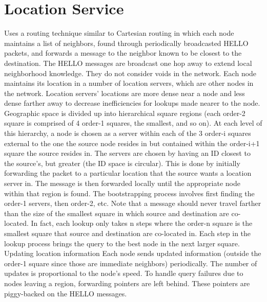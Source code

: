 \documentclass[conference]{IEEEtran}
\begin{document}

\section{Location Service}
\cite{Li:2000:SLS:345910.345931}Uses a routing technique similar to Cartesian routing in which each node maintains a list of neighbors, found through periodically broadcasted HELLO packets, and forwards a message to the neighbor known to be closest to the destination.
The HELLO messages are broadcast one hop away to extend local neighborhood knowledge.
They do not consider voids in the network.
Each node maintains its location in a number of location servers, which are other nodes in the network.
Location servers' locations are more dense near a node and less dense farther away to decrease inefficiencies for lookups made nearer to the node.
Geographic space is divided up into hierarchical square regions (each order-2 square is comprised of 4 order-1 squares, the smallest, and so on).
At each level of this hierarchy, a node is chosen as a server within each of the 3 order-i squares external to the one the source node resides in but contained within the order-i+1 square the source resides in. 
The servers are chosen by having an ID closest to the source's, but greater (the ID space is circular).
This is done by initially forwarding the packet to a particular location that the source wants a location server in.
The message is then forwarded locally until the appropriate node within that region is found.
The bootstrapping process involves first finding the order-1 servers, then order-2, etc.
Note that a message should never travel farther than the size of the smallest square in which source and destination are co-located.
In fact, each lookup only takes n steps where the order-n square is the smallest square that source and destination are co-located in.   
Each step in the lookup process brings the query to the best node in the next larger square.          
Updating location information        
Each node sends updated information (outside the order-1 square since those are immediate neighbors) periodically.
The number of updates is proportional to the node's speed.
To handle query failures due to nodes leaving a region, forwarding pointers are left behind.
These pointers are piggy-backed on the HELLO messages.
\end{document}
